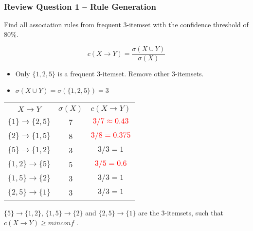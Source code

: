 \documentclass[aspectratio=169, 10pt]{beamer}
\begin{document}
\begin{frame}[t]
    \frametitle{Review Question 1 -- Rule Generation}
    \small

    Find all association rules from frequent 3-itemset with the confidence threshold of 80\%.
    
    \[ c(X \to Y) = \frac{\sigma(X \cup Y)}{\sigma(X)} \] 

    \begin{itemize}
        \item Only $\{1, 2, 5\}$ is a frequent 3-itemset. Remove other 3-itemsets.
        \item $\sigma(X \cup Y) = \sigma (\{ 1, 2, 5\}) = 3$
    \end{itemize}

    \begin{table}[]
        \footnotesize
        \begin{tabular}{c|c|c}
        $X \to Y$                & $\sigma(X)$ & $c(X \to Y)$ \\ \hline
        $\{ 1 \} \to \{  2, 5\}$ & 7           & \textcolor{red}{$3/7 \approx 0.43$} \\ 
        $\{ 2 \} \to \{  1, 5\}$ & 8           & \textcolor{red}{$3/8 = 0.375$} \\ 
        $\{ 5 \} \to \{  1, 2\}$ & 3           & $3/3 = 1$ \\ 
        $\{ 1, 2 \} \to \{  5\}$ & 5           & \textcolor{red}{$3/5 = 0.6$} \\ 
        $\{ 1, 5 \} \to \{  2\}$ & 3           & $3/3 = 1$ \\ 
        $\{ 2, 5 \} \to \{  1\}$ & 3           & $3/3 = 1$ \\ 
        \end{tabular}
    \end{table}

    $\{ 5 \} \to \{  1, 2\}$, $\{ 1, 5 \} \to \{  2\}$ and $\{ 2, 5 \} \to \{  1\}$ are the 3-itemsets, such that $c(X \to Y) \geq \textit{minconf}$ .

\end{frame}
\end{document}
